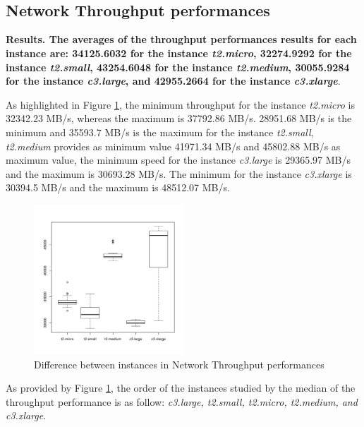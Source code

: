 \documentclass[10pt, conference]{IEEEtran}
\begin{document}
\

\

\subsection{Network Throughput performances}


\textbf{Results. The averages of the throughput performances results for each instance are: 34125.6032 for the instance \textit{t2.micro}, 32274.9292 for the instance \textit{t2.small}, 43254.6048 for the instance \textit{t2.medium}, 30055.9284 for the instance \textit{c3.large}, and 42955.2664 for the instance \textit{c3.xlarge}}.


As highlighted in Figure \ref{fig:netperf}, the minimum throughput for the instance \textit{t2.micro} is 32342.23 MB/s, whereas the maximum is 37792.86 MB/s. 28951.68 MB/s is the minimum and 35593.7 MB/s is the maximum for the instance \textit{t2.small}, \textit{t2.medium} provides as minimum value 41971.34 MB/s and 45802.88 MB/s as maximum value, the minimum speed for the instance \textit{c3.large} is 29365.97 MB/s and the maximum is 30693.28 MB/s. The minimum for the instance \textit{c3.xlarge} is 30394.5 MB/s and the maximum is 48512.07 MB/s.



\begin{figure}
\includegraphics[width=0.5\textwidth]{plots/netperf.pdf}
\caption{Difference between instances in Network Throughput performances}
\label{fig:netperf}
\end{figure}

As provided by Figure \ref{fig:netperf}, the order of the instances studied by the median of the throughput performance is as follow: \textit{c3.large, t2.small, t2.micro, t2.medium, and c3.xlarge}.


\

\noindent{}
\end{document}
